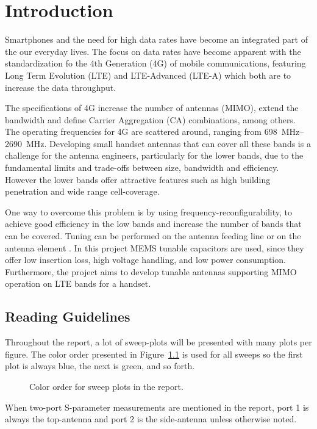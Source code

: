 \chapter{Introduction}
\label{cha:intro}
Smartphones and the need for high data rates have become an integrated part of the our everyday lives. The focus on data rates have become apparent with the standardization fo the 4th Generation (4G) of mobile communications, featuring Long Term Evolution (LTE) and LTE-Advanced (LTE-A) which both are to increase the data throughput. 

The specifications of 4G increase the number of antennas (MIMO), extend the bandwidth and define Carrier Aggregation (CA) combinations, among others. The operating frequencies for 4G are scattered around, ranging from \SIrange{698}{2690}{MHz}. Developing small handset antennas that can cover all these bands is a challenge for the antenna engineers, particularly for the lower bands, due to the fundamental limits and trade-offs between size, bandwidth and efficiency\cite{}. However the lower bands offer attractive features such as high building penetration and wide range cell-coverage. 

One way to overcome this problem is by using frequency-reconfigurability, to achieve good efficiency in the low bands and increase the number of bands that can be covered. Tuning can be performed on the antenna feeding line \cite{} \cite{} or on the antenna element \cite{} \cite{}. In this project MEMS tunable capacitors are used, since they offer low insertion loss, high voltage handling, and low power consumption\cite{}. Furthermore, the project aims to develop tunable antennas supporting MIMO operation on LTE bands for a handset. 

\section{Reading Guidelines}
Throughout the report, a lot of sweep-plots will be presented with many plots per figure. The color order presented in Figure~\ref{fig:colororder} is used for all sweeps so the first plot is always blue, the next is green, and so forth.

\begin{figure}[htbp]
    \centering
    \caption{Color order for sweep plots in the report.}
    \label{fig:colororder}
\end{figure}

When two-port S-parameter measurements are mentioned in the report, port 1 is always the top-antenna and port 2 is the side-antenna unless otherwise noted.

